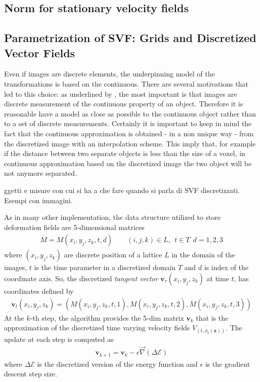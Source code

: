 \subsection{Norm for stationary velocity fields}


\subsection{Parametrization of SVF: Grids and Discretized Vector Fields}\label{se:parametrization_SVF}

Even if images are discrete elements, the underpinning model of the transformations is based on the continuous. There are several motivations that led to this choice: as underlined by \cite{szeliski1994image}, the most important is that images are discrete measurement of the continuous property of an object. Therefore it is reasonable have a model as close as possible to the continuous object rather than to a set of discrete measurements. 
Certainly it is important to keep in mind the fact that the continuous approximation is obtained - in a non unique way - from the discretized image with an interpolation scheme. This imply that, for example if the distance between two separate objects is less than the size of a voxel, in continuous approximation based on the discretized image the two object will be not anymore separated.

ggetti e misure con cui si ha a che fare quando si parla di SVF discretizzati. Esempi con immagini. 

As in many other implementation, the data structure utilized to store deformation fields are 5-dimensional matrices
\begin{align}\label{eq:basic_data_structure}
M = M(x_i,y_j,z_k,t,d) \qquad (i,j,k)\in L , ~~ t \in T  ~~ d = 1,2,3
\end{align}
where $(x_i,y_j,z_k)$ are discrete position of a lattice $L$ in the domain of the images, $t$ is the time parameter in a discretized domain $T$ and $d$ is index of the coordinate axis. So, the discretized \emph{tangent vector} $\mathbf{v}_{\tau}(x_i,y_j,z_k)$ at time $t$, has coordinates defined by
\begin{align*}
\mathbf{v}_{t}(x_i,y_j,z_k) = (M(x_i,y_j,z_k,t ,1), M(x_i,y_j,z_k,t,2), M(x_i,y_j,z_k,t ,3))
\end{align*}
At the $k$-th step, the algorithm provides the 5-dim matrix $\mathbf{v}_{k}$ that is the approximation of the discretized time varying velocity fields $V_{(t,\phi_{t} (\mathbf{x}))}$. The update at each step is computed as
\begin{align*}
\mathbf{v}_{k+1} = \mathbf{v}_{k} - \epsilon \vec{\nabla} (\Delta\mathcal{E})
\end{align*}
where $\Delta\mathcal{E}$ is the discretized version of the energy function and $\epsilon$ is the gradient descent step size.




